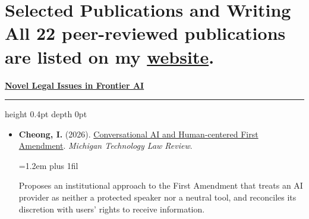 \documentclass[10pt]{article}
\newcommand{\pubtheme}[1]{%
  \par\vspace{7pt}%
  \noindent
  {\small\bfseries\color{black}\uline{#1}}%
  \nobreak\hspace{0.4em}%
  \leaders\hrule height 0.4pt depth 0pt \hfill\par
  \vspace{2pt}%
}
\newcommand{\pubdesc}[1]{%
  \par\vspace{1pt}%
  \begingroup
  \leftskip=1.2em
  \rightskip=0pt plus 1fil\relax
  \parfillskip=0pt\relax
  {\footnotesize\color{black!58}#1\par}%
  \endgroup
}
\begin{document}
\section*{Selected Publications and Writing {\normalfont\small * All 22 peer-reviewed publications are listed on my \href{https://inyoungcheong.github.io/publications}{website}.}}
{\small
\pubtheme{Novel Legal Issues in Frontier AI}
\begin{itemize}[itemsep=4pt]
\item \textbf{Cheong, I.} (2026). \href{https://papers.ssrn.com/sol3/papers.cfm?abstract_id=5435335}{Conversational AI and Human-centered First Amendment}. \textit{Michigan Technology Law Review}.
\pubdesc{Proposes an institutional approach to the First Amendment that treats an AI provider as neither a protected speaker nor a neutral tool, and reconciles its discretion with users' rights to receive information.}


\end{itemize}}
\end{document}
